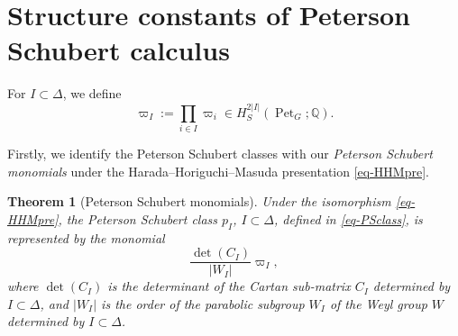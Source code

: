 \documentclass[11pt, letterpaper]{amsart}
\numberwithin{equation}{section}
\newtheorem{theorem}{Theorem}[section]
\DeclareMathOperator{\Pet}{Pet}
\begin{document}
\section{Structure constants of Peterson Schubert calculus} \label{sec-Structure}
For $I\subset\Delta$, we define
\begin{equation} \label{eq-monomial}
    \varpi_{I}:=\prod_{i\in I}\varpi_{i}\in H_S^{2|I|}(\Pet_{G};\mathbb{Q}).
\end{equation}

Firstly, we identify the Peterson Schubert classes with our \emph{Peterson Schubert monomials} under the Harada--Horiguchi--Masuda presentation \eqref{eq-HHMpre}. 

\begin{theorem}[Peterson Schubert monomials] \label{thm-PSM}
Under the isomorphism \eqref{eq-HHMpre}, the Peterson Schubert class $p_I$, $I \subset \Delta$, defined in \eqref{eq-PSclass}, is represented by the monomial 
\begin{equation} \label{eq-PSM}
\frac{\operatorname{det}\left(C_I\right)}{\left|W_I\right|}\varpi_{I}, 
\end{equation}
where $\operatorname{det}\left(C_I\right)$ is the determinant of the Cartan sub-matrix $C_I$ determined by $I\subset\Delta$, and $\left|W_I\right|$ is the order of the parabolic subgroup $W_I$ of the Weyl group $W$ determined by $I\subset\Delta$.
\end{theorem}
\end{document}
